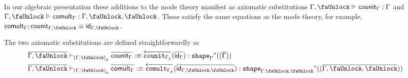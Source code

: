 \documentclass[10pt]{article}
\theoremstyle{definition}
\newcommand{\yields}{\vdash}
\newcommand{\id}{\mathsf{id}}
\newcommand{\rewrite}[2]{\overleftarrow{#1}(#2)}
\newcommand\St[2]{\ensuremath{{#1}^*(#2)}}
\newcommand\ctxtuple[1]{(#1)}
\newcommand{\modeof}[1]{{#1}_p}
\newcommand{\tshape}[1]{\ensuremath{\mathtt{shape}_{#1}}}
\newcommand{\qyields}{\Vdash}
\newcommand{\upstairs}[1]{\overline{#1}}
\newcommand{\lock}{\text{\faUnlock}}
\newcommand\fcomult[1]{\ensuremath{\mathtt{comult}_{#1}}}
\newcommand\fcounit[1]{\ensuremath{\mathtt{counit}_{#1}}}
\newcommand{\counit}[1]{\mathsf{counit}_{#1}}
\newcommand{\comult}[1]{\mathsf{comult}_{#1}}
\begin{document}
In our algebraic presentation these additions to the mode theory manifest as axiomatic substitutions $\Gamma, \lock \qyields \counit{\Gamma} : \Gamma$ and $\Gamma, \lock \qyields \comult{\Gamma} : \Gamma, \lock, \lock$. These satisfy the same equations as the mode theory, for example, $\comult{\Gamma};\counit{\Gamma, \lock} \equiv \id_{\Gamma, \lock}$.


The two axiomatic substitutions are defined straightforwardly as
\begin{align*}
\upstairs{\Gamma, \lock} &\yields_{\modeof{(\Gamma, \lock)}} \upstairs{\counit{\Gamma}} :\equiv \rewrite{\fcounit{\modeof{\Gamma}}}{\upstairs{\id_{\Gamma}}} : \St{\tshape{\Gamma}}{\ctxtuple{\upstairs{\Gamma}}} \\
\upstairs{\Gamma, \lock} &\yields_{\modeof{(\Gamma, \lock)}} \upstairs{\comult{\Gamma}} :\equiv \rewrite{\fcomult{\modeof{\Gamma}}}{\upstairs{\id_{\Gamma, \lock, \lock}}} : \St{\tshape{\Gamma, \lock, \lock}}{\ctxtuple{\upstairs{\Gamma, \lock, \lock}}}
\end{align*}
\end{document}
